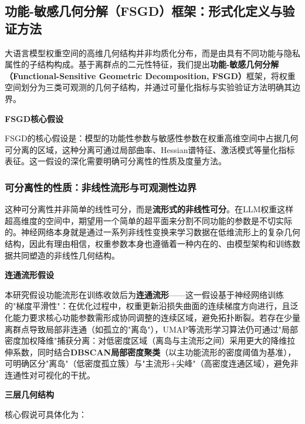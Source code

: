 \documentclass[letterpaper,twocolumn,10pt]{article}
\begin{document}
\subsection{功能-敏感几何分解（FSGD）框架：形式化定义与验证方法}

大语言模型权重空间的高维几何结构并非均质化分布，而是由具有不同功能与隐私属性的子结构构成。基于离群点的二元性特征，我们提出\textbf{功能-敏感几何分解（Functional-Sensitive Geometric Decomposition, FSGD）}框架，将权重空间划分为三类可观测的几何子结构，并通过可量化指标与实验验证方法明确其边界。

\textbf{FSGD核心假设}

FSGD的核心假设是：模型的功能性参数与敏感性参数在权重高维空间中占据几何可分离的区域，这种分离可通过局部曲率、Hessian谱特征、激活模式等量化指标表征。这一假设的深化需要明确可分离性的性质及度量方法。

\subsubsection{可分离性的性质：非线性流形与可观测性边界}

这种可分离性并非简单的线性可分，而是\textbf{流形式的非线性可分}。在LLM权重这样超高维度的空间中，期望用一个简单的超平面来分割不同功能的参数是不切实际的。神经网络本身就是通过一系列非线性变换来学习数据在低维流形上的复杂几何结构，因此有理由相信，权重参数本身也遵循着一种内在的、由模型架构和训练数据共同塑造的非线性几何结构。

\textbf{连通流形假设}

本研究假设功能流形在训练收敛后为\textbf{连通流形}——这一假设基于神经网络训练的"梯度平滑性"：在优化过程中，权重更新沿损失曲面的连续梯度方向进行，且泛化能力要求核心功能参数需形成协同调整的连续区域，避免拓扑断裂。若存在少量离群点导致局部非连通（如孤立的"离岛"），UMAP等流形学习算法仍可通过"局部密度加权降维"捕获分离：对低密度区域（离岛与主流形之间）采用更大的降维拉伸系数，同时结合\textbf{DBSCAN局部密度聚类}（以主功能流形的密度阈值为基准），可明确区分"离岛"（低密度孤立簇）与"主流形+尖峰"（高密度连通区域），避免非连通性对可视化的干扰。

\textbf{三层几何结构}

核心假说可具体化为：
\end{document}
